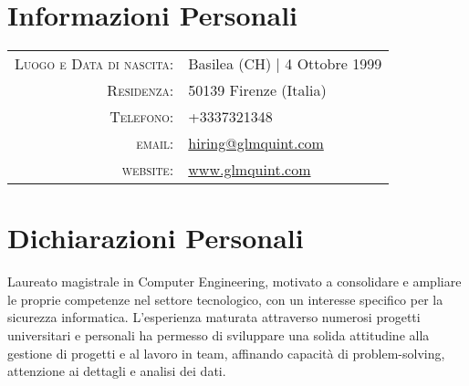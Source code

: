 \documentclass[a4paper,11pt]{article} %
\begin{document}
\pagestyle{fancy} %
\fancyhead{}
\renewcommand{\headrulewidth}{0pt}
\cfoot{}


\par{\bigskip\par} %

\section{Informazioni Personali}

\begin{tabular}{rl}
\textsc{Luogo e Data di nascita:} & Basilea (CH) | 4 Ottobre 1999\\
\textsc{Residenza:} & 50139 Firenze (Italia) \\
\textsc{Telefono:} & +3337321348\\
\textsc{email:} & \href{mailto:hiring@glmquint.com}{hiring@glmquint.com}\\
\textsc{website:} & \href{www.glmquint.com}{www.glmquint.com}
\end{tabular}


\section{Dichiarazioni Personali}

Laureato magistrale in Computer Engineering, motivato a consolidare e ampliare le proprie competenze nel settore tecnologico, con un interesse specifico per la sicurezza informatica. L'esperienza maturata attraverso numerosi progetti universitari e personali ha permesso di sviluppare una solida attitudine alla gestione di progetti e al lavoro in team, affinando capacità di problem-solving, attenzione ai dettagli e analisi dei dati.


\end{document}
